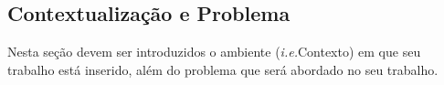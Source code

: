 

\subsection{\textbf{Contextualização e Problema}}
    \label{subsec:contextualizacao-problema}

    Nesta seção devem ser introduzidos o ambiente (\textit{i.e.}Contexto) em que seu trabalho está inserido, além do problema que será abordado no seu trabalho.
